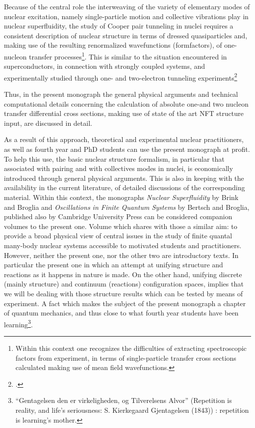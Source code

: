 Because of the central role the interweaving of the variety of elementary modes of nuclear excitation, namely single-particle motion and collective vibrations play in nuclear superfluidity, the study of Cooper pair tunneling in nuclei requires  a consistent description of nuclear structure in terms of dressed quasiparticles and, making use of the resulting renormalized wavefunctions (formfactors),  of one-nucleon transfer processes\footnote{Within this context one recognizes the difficulties of extracting spectroscopic factors from experiment, in terms of single-particle transfer cross sections calculated making use of mean field wavefunctions.}. This is similar to the situation encountered in superconductors, in connection with strongly coupled systems, and experimentally studied through one- and two-electron tunneling experiments\footnote{\cite{Giaver:73}.} 

Thus, in the present monograph the general physical arguments and technical computational details concerning the   calculation of  absolute one-and two nucleon  transfer differential cross sections, making use of state of the art NFT structure input, are discussed in detail. 


As a result of this approach, theoretical and experimental nuclear practitioners, as well as fourth year and PhD students can use the present monograph at profit. To help this use, the basic nuclear structure formalism, in particular that associated with pairing and with collectives modes in nuclei, is economically introduced through general physical arguments. This is also in keeping with the availability in the current literature, of detailed discussions of the corresponding material. Within this context, the monographs \emph{Nuclear Superfluidity} by Brink and Broglia and \emph{Oscillations in Finite Quantum Systems}  by Bertsch and Broglia, published also by Cambridge University Press can be considered companion volumes to the present one. Volume which shares with those a similar aim: to provide a broad physical view of central issues in the study of finite quantal many-body nuclear systems accessible to motivated students and practitioners. However, neither the present one, nor the other two are introductory texts. In particular the present one in which an attempt at unifying structure and reactions as it happens in nature is made. On the other hand, unifying discrete (mainly structure) and continuum (reactions) configuration spaces, implies that we will be dealing with those structure results which can be tested by means of experiment. A fact which makes the subject of the present monograph a chapter of quantum mechanics, and thus close to what fourth year students have been learning\footnote{``Gentagelsen den er virkeligheden, og Tilverelsens Alvor'' (Repetition is reality, and life's seriousness: S. Kierkegaard Gjentagelsen (1843)) {} : repetition is learning's mother.}.

